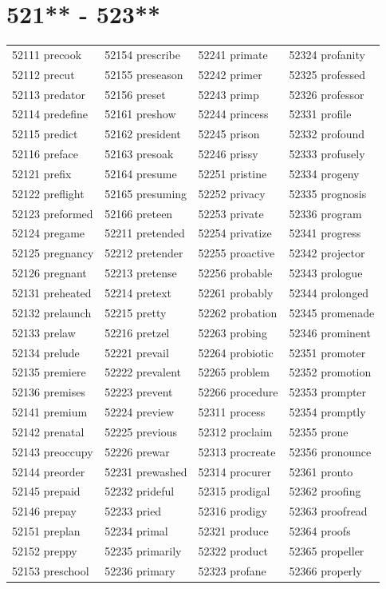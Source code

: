 \documentclass[10pt, oneside]{book}
\begin{document}
\begin{table}
	\centering
	\section*{521** - 523**}
	\begin{tabular}{l l l l}
52111 precook &52154 prescribe &52241 primate &52324 profanity\\
52112 precut &52155 preseason &52242 primer &52325 professed\\
52113 predator &52156 preset &52243 primp &52326 professor\\
52114 predefine &52161 preshow &52244 princess &52331 profile\\
52115 predict &52162 president &52245 prison &52332 profound\\
52116 preface &52163 presoak &52246 prissy &52333 profusely\\
52121 prefix &52164 presume &52251 pristine &52334 progeny\\
52122 preflight &52165 presuming &52252 privacy &52335 prognosis\\
52123 preformed &52166 preteen &52253 private &52336 program\\
52124 pregame &52211 pretended &52254 privatize &52341 progress\\
52125 pregnancy &52212 pretender &52255 proactive &52342 projector\\
52126 pregnant &52213 pretense &52256 probable &52343 prologue\\
52131 preheated &52214 pretext &52261 probably &52344 prolonged\\
52132 prelaunch &52215 pretty &52262 probation &52345 promenade\\
52133 prelaw &52216 pretzel &52263 probing &52346 prominent\\
52134 prelude &52221 prevail &52264 probiotic &52351 promoter\\
52135 premiere &52222 prevalent &52265 problem &52352 promotion\\
52136 premises &52223 prevent &52266 procedure &52353 prompter\\
52141 premium &52224 preview &52311 process &52354 promptly\\
52142 prenatal &52225 previous &52312 proclaim &52355 prone\\
52143 preoccupy &52226 prewar &52313 procreate &52356 pronounce\\
52144 preorder &52231 prewashed &52314 procurer &52361 pronto\\
52145 prepaid &52232 prideful &52315 prodigal &52362 proofing\\
52146 prepay &52233 pried &52316 prodigy &52363 proofread\\
52151 preplan &52234 primal &52321 produce &52364 proofs\\
52152 preppy &52235 primarily &52322 product &52365 propeller\\
52153 preschool &52236 primary &52323 profane &52366 properly\\
	\end{tabular}
 \end{table}
\clearpage
\end{document}

